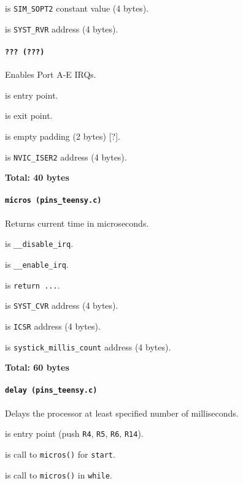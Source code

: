  is \texttt{SIM\_SOPT2} constant value (4 bytes).

 is \texttt{SYST\_RVR} address (4 bytes).

\paragraph{\texttt{??? (???)}} Enables Port A-E IRQs.

 is entry point.

 is exit point.

 is empty padding (2 bytes) [?].

 is \texttt{NVIC\_ISER2} address (4 bytes).

\textbf{Total: 40 bytes}


\paragraph{\texttt{micros (pins\_teensy.c)}} Returns current time in
microseconds.

 is \texttt{\_\_disable\_irq}.

 is \texttt{\_\_enable\_irq}.

 is \texttt{return ...}.

\vspace{1em}

 is \texttt{SYST\_CVR} address (4 bytes).

 is \texttt{ICSR} address (4 bytes).

 is \texttt{systick\_millis\_count} address (4 bytes).

\textbf{Total: 60 bytes}

\paragraph{\texttt{delay (pins\_teensy.c)}} Delays the processor at least
specified number of milliseconds.

 is entry point (push \texttt{R4}, \texttt{R5},
\texttt{R6}, \texttt{R14}).

 is call to \texttt{micros()} for \texttt{start}.

 is call to \texttt{micros()} in \texttt{while}.

